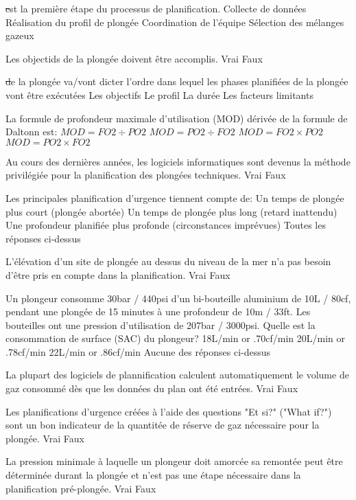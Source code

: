 \documentclass[english,10pt,a4paper,twoside]{article}
\begin{document}
	\begin{outline}
		\1 \st est la première étape du processus de planification.
			\2 Collecte de données
			\2 Réalisation du profil de plongée
			\2 Coordination de l'équipe
			\2 Sélection des mélanges gazeux 

		\1 Les objectids de la plongée doivent être accomplis.
			\2 Vrai
			\2 Faux

		\1 \st de la plongée va/vont dicter l'ordre dans lequel les phases planifiées de la plongée vont être exécutées
			\2 Les objectifs
			\2 Le profil
			\2 La durée
			\2 Les facteurs limitants

		\1 La formule de profondeur maximale d'utilisation (MOD) dérivée de la formule de Daltonn est:
			\2 $MOD=FO2 \div PO2$
			\2 $MOD=PO2 \div FO2$
			\2 $MOD=FO2 \times PO2$
			\2 $MOD=PO2 \times FO2$

		\1 Au cours des dernières années, les logiciels informatiques sont devenus la méthode privilégiée pour la planification des plongées techniques.
			\2 Vrai
			\2 Faux

		\1 Les principales planification d'urgence tiennent compte de:
			\2 Un temps de plongée plus court (plongée abortée)
			\2 Un temps de plongée plus long (retard inattendu)
			\2 Une profondeur planifiée plus profonde (circonstances imprévues)
			\2 Toutes les réponses ci-dessus

		\1 L'élévation d'un site de plongée au dessus du niveau de la mer n'a pas besoin d'être pris en compte dans la planification.
			\2 Vrai
			\2 Faux

		\1 Un plongeur consomme 30bar / 440psi d'un bi-bouteille aluminium de 10L / 80cf, pendant une plongée de 15 minutes à une profondeur de 10m / 33ft. Les bouteilles ont une pression d'utilisation de 207bar / 3000psi. Quelle est la consommation de surface (SAC) du plongeur?
			\2 18L/min or .70cf/min
			\2 20L/min or .78cf/min
			\2 22L/min or .86cf/min
			\2 Aucune des réponses ci-dessus

		\1 La plupart des logiciels de plannification calculent automatiquement le volume de gaz consommé dès que les données du plan ont été entrées.
			\2 Vrai
			\2 Faux

		\1 Les planifications d'urgence créées à l'aide des questions "Et si?" ("What if?") sont un bon indicateur de la quantitée de réserve de gaz nécessaire pour la plongée. 
			\2 Vrai
			\2 Faux

		\1 La pression minimale à laquelle un plongeur doit amorcée sa remontée peut être déterminée durant la plongée et n'est pas une étape nécessaire dans la planification pré-plongée.
			\2 Vrai
			\2 Faux


\end{outline}
\end{document}
